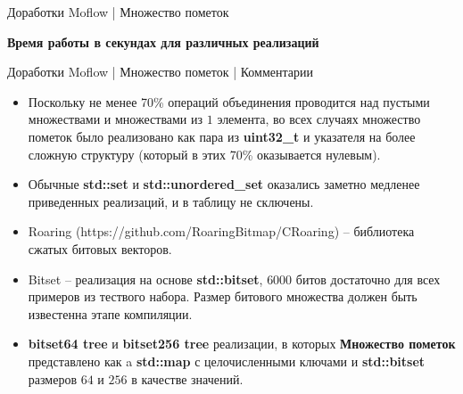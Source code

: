 \documentclass[10pt]{beamer}
\begin{document}
\begin{frame}{Доработки Moflow | Множество пометок}

    \textbf{Время работы в секундах для различных реализаций}\\
\end{frame}


\begin{frame}{Доработки Moflow | Множество пометок | Комментарии }

\begin{itemize}
  \item Поскольку не менее 70\% операций объединения проводится над пустыми множествами и множествами из $1$ элемента, во всех случаях множество пометок было реализовано как пара из \textbf{uint32\_t} и указателя на более сложную структуру (который в этих 70\% оказывается нулевым).
  \item Обычные \textbf{std::set} и \textbf{std::unordered\_set} оказались заметно медленее приведенных реализаций, и в таблицу не сключены.
  \item Roaring (https://github.com/RoaringBitmap/CRoaring) -- библиотека сжатых битовых векторов.
\item Bitset -- реализация на основе \textbf{std::bitset}, $6000$ битов достаточно для всех примеров из тествого набора. Размер битового множества должен быть известенна этапе компиляции.
\item \textbf{bitset64 tree} и \textbf{bitset256 tree} реализации, в которых \textbf{Множество пометок} представлено как a \textbf{std::map} с целочисленными ключами и \textbf{std::bitset} размеров $64$ и $256$ в качестве значений.
\end{itemize}
\end{frame}


\appendix
\end{document}
